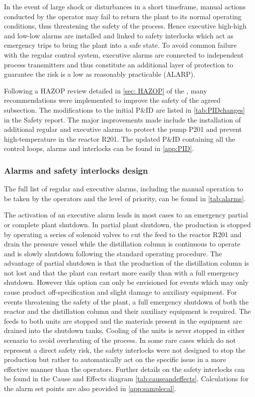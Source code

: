 In the event of large shock or disturbances in a short timeframe, manual actions conducted by the operator may fail to return the plant to its normal operating conditions, thus threatening the safety of the process. Hence executive high-high and low-low alarms are installed and linked to safety interlocks which act as emergency trips to bring the plant into a safe state. To avoid common failure with the regular control system, executive alarms are connected to independent process transmitters and thus constitute an additional layer of protection to guarantee the risk is a low as reasonably practicable (ALARP).  

Following a HAZOP review detailed in \cref{sec: HAZOP} of the , many recommendations were implemented to improve the safety of the agreed subsection. The modifications to the initial P\&ID are listed in \cref{tab:PIDchanges} in the Safety report. The major improvements made include the installation of additional regular and executive alarms to protect the pump P201 and prevent high-temperature in the reactor R201. The updated P\&ID containing all the control loops, alarms and interlocks can be found in \cref{app:PID}.
 

\subsubsection{Alarms and safety interlocks design}

The full list of regular and executive alarms, including the manual operation to be taken by the operators and the level of priority, can be found in \cref{tab:alarms}. 

The activation of an executive alarm leads in most cases to an emergency partial or complete plant shutdown. In partial plant shutdown, the production is stopped by operating a series of solenoid valves to cut the feed to the reactor R201 and drain the pressure vessel while the distillation column is continuous to operate and is slowly shutdown following the standard operating procedure. The advantage of partial shutdown is that the production of the distillation column is not lost and that the plant can restart more easily than with a full emergency shutdown. However this option can only be envisioned for events which may only cause product off-specification and slight damage to auxiliary equipment. For events threatening the safety of the plant, a full emergency shutdown of both the reactor and the distillation column and their auxiliary equipment is required. The feeds to both units are stopped and the materials present in the equipment are drained into the shutdown tanks. Cooling of the units is never stopped in either scenario to avoid overheating of the process. In some rare cases which do not represent a direct safety risk, the safety interlocks were not designed to stop the production but rather to automatically act on the specific issue in a more effective manner than the operators. Further details on the safety interlocks can be found in the Cause and Effects diagram \cref{tab:causeandeffects}. Calculations for the alarm set points are also provided in \cref{app:samplecal}.


